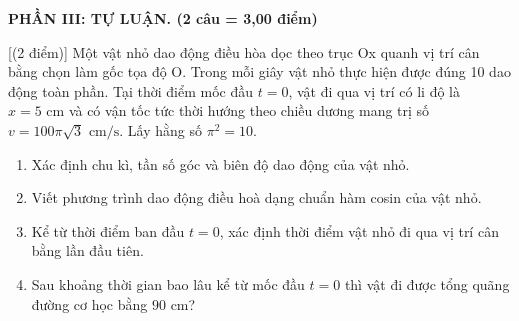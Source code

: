 
\noindent \textbf{PHẦN III: TỰ LUẬN. (2 câu = 3,00 điểm)}

\begin{ex}[{(2 điểm)}]\label{TL1}
	Một vật nhỏ dao động điều hòa dọc theo trục Ox quanh vị trí cân bằng chọn làm gốc tọa độ O. Trong mỗi giây vật nhỏ thực hiện được đúng 10 dao động toàn phần. Tại thời điểm mốc đầu $t=0$, vật đi qua vị trí có li độ là $x=5\text{ cm}$ và có vận tốc tức thời hướng theo chiều dương mang trị số $v=100\pi\sqrt{3}\text{ cm/s}$. Lấy hằng số $\pi^{2}=10$.
	\begin{enumerate}
		\item[a)] Xác định chu kì, tần số góc và biên độ dao động của vật nhỏ.
		\item[b)] Viết phương trình dao động điều hoà dạng chuẩn hàm cosin của vật nhỏ.
		\item[c)] Kể từ thời điểm ban đầu $t=0$, xác định thời điểm vật nhỏ đi qua vị trí cân bằng lần đầu tiên.
		\item[d)] Sau khoảng thời gian bao lâu kể từ mốc đầu $t=0$ thì vật đi được tổng quãng đường cơ học bằng $90\text{ cm}$?
	\end{enumerate}
\end{ex}
